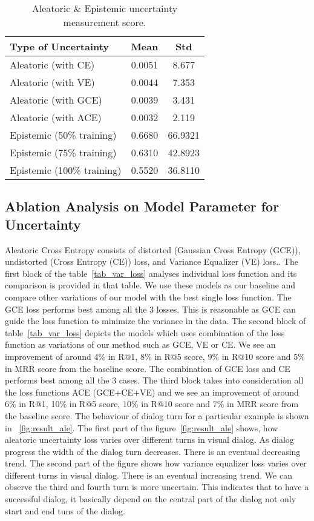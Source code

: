 \documentclass[review]{elsarticle}
\begin{document}
\begin{table}
	\centering
\begin{tabular}{|p{4.2cm}|c|c|}
		\hline
		\textbf{Type of Uncertainty}&  \textbf{Mean} & \textbf{Std} \\
		\hline
		Aleatoric (with CE)       &0.0051  & 8.677\\
		Aleatoric (with VE)       &0.0044  & 7.353\\
		Aleatoric (with GCE)      &0.0039  & 3.431\\
		Aleatoric (with ACE)      &0.0032  & 2.119\\\hline
		Epistemic (50\% training) &0.6680  & 66.9321\\
		Epistemic (75\% training) &0.6310  & 42.8923\\
		Epistemic (100\% training)&0.5520  & 36.8110\\\hline
\end{tabular}
\caption{\label{tab_Uncertainty} Aleatoric \& Epistemic uncertainty measurement score.}
\end{table}

\subsection{Ablation Analysis on  Model Parameter for Uncertainty }\label{variants}
Aleatoric Cross Entropy consists of distorted (Gaussian Cross Entropy (GCE)), undistorted (Cross Entropy (CE)) loss, and Variance Equalizer (VE) loss.. The first block of the table~\ref{tab_var_loss} analyses individual loss function and its comparison is provided in that table. We use these models as our baseline and compare other variations of our model with the best single loss function. The GCE loss performs best among all the 3 losses. This is reasonable as GCE can guide the loss function to minimize the variance in the data. The second block of table~\ref{tab_var_loss} depicts the models which uses combination of the loss function as variations of our method such as GCE, VE or CE. We see an improvement of around 4\% in R@1, 8\% in R@5 score, 9\% in R@10 score and 5\% in MRR score from the baseline score. The combination of GCE loss and CE performs best among all the 3 cases. The third block takes into consideration all the loss functions ACE (GCE+CE+VE) and we see an improvement of around 6\% in R@1, 10\% in R@5 score, 10\% in R@10 score and 7\% in MRR score from the baseline score.  The behaviour of dialog turn for a particular example is shown in ~\ref{fig:result_ale}.  The first part of the figure~\ref{fig:result_ale} shows, how aleatoric uncertainty loss varies over different turns in visual dialog. As dialog progress the width of the dialog turn decreases. There is an eventual decreasing trend. The second part of the figure shows how variance equalizer loss varies over different turns in visual dialog. There is an eventual increasing trend. We can observe the third and fourth turn is more uncertain. This indicates that to have a successful dialog, it basically depend on the central part of the dialog not only start and end tuns of the dialog. 
\end{document}
